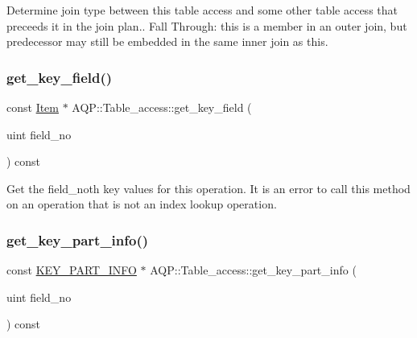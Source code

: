 Determine join type between this table access and some other table access that preceeds it in the join plan.. Fall Through\+: \textquotesingle{}this\textquotesingle{} is a member in an outer join, but \textquotesingle{}predecessor\textquotesingle{} may still be embedded in the same inner join as \textquotesingle{}this\textquotesingle{}.\mbox{\label{classAQP_1_1Table__access_a5160036ccc841dc61d1728f86a30bd80}} 
\subsubsection{\texorpdfstring{get\+\_\+key\+\_\+field()}{get\_key\_field()}}
{\footnotesize\ttfamily const \mbox{\hyperlink{classItem}{Item}} $\ast$ A\+Q\+P\+::\+Table\+\_\+access\+::get\+\_\+key\+\_\+field (\begin{DoxyParamCaption}\item[{uint}]{field\+\_\+no }\end{DoxyParamCaption}) const}

Get the field\+\_\+no\textquotesingle{}th key values for this operation. It is an error to call this method on an operation that is not an index lookup operation. \mbox{\label{classAQP_1_1Table__access_a569b503d8f970211dab3544b300bddc6}} 
\subsubsection{\texorpdfstring{get\+\_\+key\+\_\+part\+\_\+info()}{get\_key\_part\_info()}}
{\footnotesize\ttfamily const \mbox{\hyperlink{classKEY__PART__INFO}{K\+E\+Y\+\_\+\+P\+A\+R\+T\+\_\+\+I\+N\+FO}} $\ast$ A\+Q\+P\+::\+Table\+\_\+access\+::get\+\_\+key\+\_\+part\+\_\+info (\begin{DoxyParamCaption}\item[{uint}]{field\+\_\+no }\end{DoxyParamCaption}) const}

